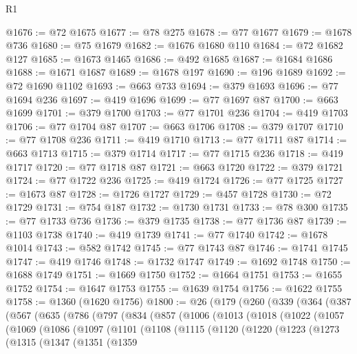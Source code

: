 \begin{lexlean}{R1}
\begin{coremodule}
@1676 := @72 @1675
@1677 := @78 @275
@1678 := @77 @1677
@1679 := @1678 @736
@1680 := @75 @1679
@1682 := @1676 @1680 @110
@1684 := @72 @1682 @127
@1685 := @1673 @1465
@1686 := @492 @1685
@1687 := @1684 @1686
@1688 := @1671 @1687
@1689 := @1678 @197
@1690 := @196 @1689
@1692 := @72 @1690 @1102
@1693 := @663 @733
@1694 := @379 @1693
@1696 := @77 @1694 @236
@1697 := @419 @1696
@1699 := @77 @1697 @87
@1700 := @663 @1699
@1701 := @379 @1700
@1703 := @77 @1701 @236
@1704 := @419 @1703
@1706 := @77 @1704 @87
@1707 := @663 @1706
@1708 := @379 @1707
@1710 := @77 @1708 @236
@1711 := @419 @1710
@1713 := @77 @1711 @87
@1714 := @663 @1713
@1715 := @379 @1714
@1717 := @77 @1715 @236
@1718 := @419 @1717
@1720 := @77 @1718 @87
@1721 := @663 @1720
@1722 := @379 @1721
@1724 := @77 @1722 @236
@1725 := @419 @1724
@1726 := @77 @1725
@1727 := @1673 @87
@1728 := @1726 @1727
@1729 := @457 @1728
@1730 := @72 @1729
@1731 := @754 @187
@1732 := @1730 @1731
@1733 := @78 @300
@1735 := @77 @1733 @736
@1736 := @379 @1735
@1738 := @77 @1736 @87
@1739 := @1103 @1738
@1740 := @419 @1739
@1741 := @77 @1740
@1742 := @1678 @1014
@1743 := @582 @1742
@1745 := @77 @1743 @87
@1746 := @1741 @1745
@1747 := @419 @1746
@1748 := @1732 @1747
@1749 := @1692 @1748
@1750 := @1688 @1749
@1751 := @1669 @1750
@1752 := @1664 @1751
@1753 := @1655 @1752
@1754 := @1647 @1753
@1755 := @1639 @1754
@1756 := @1622 @1755
@1758 := @1360 (@1620 @1756)
@1800 := @26
    (@179
      (@260
        (@339
          (@364
            (@387
              (@567
                (@635
                  (@786
                    (@797
                      (@834
                        (@857
                          (@1006
                            (@1013
                              (@1018
                                (@1022
                                  (@1057
                                    (@1069
                                      (@1086
                                        (@1097
                                          (@1101
                                            (@1108
                                              (@1115
                                                (@1120
                                                  (@1220
                                                    (@1223
                                                      (@1273
                                                        (@1315
                                                          (@1347
                                                            (@1351
                                                              (@1359

\end{coremodule}
\end{lexlean}
